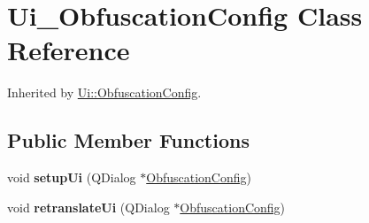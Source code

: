\hypertarget{class_ui___obfuscation_config}{}\section{Ui\+\_\+\+Obfuscation\+Config Class Reference}
\label{class_ui___obfuscation_config}


Inherited by \mbox{\hyperlink{class_ui_1_1_obfuscation_config}{Ui\+::\+Obfuscation\+Config}}.

\subsection*{Public Member Functions}
\begin{DoxyCompactItemize}
\item 
\mbox{\label{class_ui___obfuscation_config_a2d2286818db49c068db49051a950d420}} 
void {\bfseries setup\+Ui} (Q\+Dialog $\ast$\mbox{\hyperlink{class_obfuscation_config}{Obfuscation\+Config}})
\item 
\mbox{\label{class_ui___obfuscation_config_a88ddd1c0f755c2ef8d942606d6aa5c9b}} 
void {\bfseries retranslate\+Ui} (Q\+Dialog $\ast$\mbox{\hyperlink{class_obfuscation_config}{Obfuscation\+Config}})
\end{DoxyCompactItemize}
